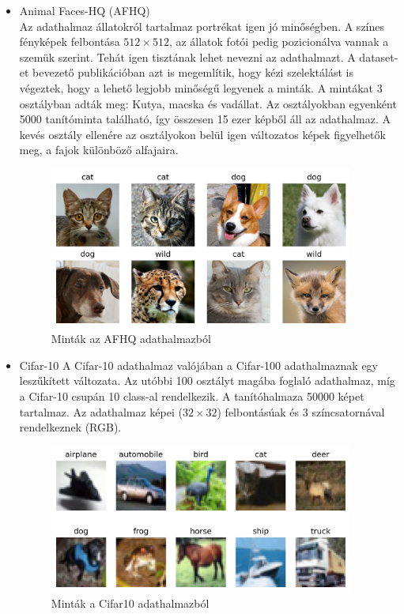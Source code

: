 \begin{itemize}
	\item Animal Faces-HQ (AFHQ) \cite{choi2020stargan}\\
	Az adathalmaz állatokról tartalmaz portrékat igen jó minőségben. A színes fényképek felbontása $ 512 \times 512 $, az állatok fotói pedig pozicionálva vannak a szemük szerint. Tehát igen tisztának lehet nevezni az adathalmazt. A dataset-et bevezető publikációban azt is megemlítik, hogy kézi szelektálást is végeztek, hogy a lehető legjobb minőségű legyenek a minták. A mintákat 3 osztályban adták meg: Kutya, macska és vadállat. Az osztályokban egyenként 5000 tanítóminta található, így összesen 15 ezer képből áll az adathalmaz. A kevés osztály ellenére az osztályokon belül igen változatos képek figyelhetők meg, a fajok különböző alfajaira.
	
	\begin{figure}[h]
		\centering
		\includegraphics[width=10cm]{images/afhq_dataset_samples.png}
		\caption{Minták az AFHQ adathalmazból}
		\label{fig:afhq_dataset_samples}
	\end{figure}
	
	\item Cifar-10 \cite{krizhevsky2009learning}
	A Cifar-10 adathalmaz valójában a Cifar-100 adathalmaznak egy leszűkített változata. Az utóbbi 100 osztályt magába foglaló adathalmaz, míg a Cifar-10 csupán 10 class-al rendelkezik. A tanítóhalmaza 50000 képet tartalmaz.
	Az adathalmaz képei ($32 \times 32$) felbontásúak és 3 színcsatornával rendelkeznek (RGB).
	
	\begin{figure}[h]
		\centering
		\includegraphics[width=10cm]{images/cifar10_dataset_samples.png}
		\caption{Minták a Cifar10 adathalmazból}
		\label{fig:cifar10_dataset_samples}
	\end{figure}
\end{itemize}

